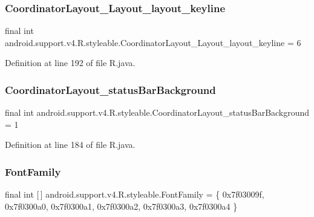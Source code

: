 \subsubsection{\texorpdfstring{CoordinatorLayout\_Layout\_layout\_keyline}{CoordinatorLayout\_Layout\_layout\_keyline}}
{\footnotesize\ttfamily final int android.\+support.\+v4.\+R.\+styleable.\+Coordinator\+Layout\+\_\+\+Layout\+\_\+layout\+\_\+keyline = 6\hspace{0.3cm}{\ttfamily [static]}}



Definition at line 192 of file R.\+java.

\mbox{\label{classandroid_1_1support_1_1v4_1_1_r_1_1styleable_a6a1da8ebca8b448fcdd32ead8be36d96}} 
\subsubsection{\texorpdfstring{CoordinatorLayout\_statusBarBackground}{CoordinatorLayout\_statusBarBackground}}
{\footnotesize\ttfamily final int android.\+support.\+v4.\+R.\+styleable.\+Coordinator\+Layout\+\_\+status\+Bar\+Background = 1\hspace{0.3cm}{\ttfamily [static]}}



Definition at line 184 of file R.\+java.

\mbox{\label{classandroid_1_1support_1_1v4_1_1_r_1_1styleable_af02bcd0e579c3c0485ea2152fa989b5d}} 
\subsubsection{\texorpdfstring{FontFamily}{FontFamily}}
{\footnotesize\ttfamily final int \mbox{[}$\,$\mbox{]} android.\+support.\+v4.\+R.\+styleable.\+Font\+Family = \{ 0x7f03009f, 0x7f0300a0, 0x7f0300a1, 0x7f0300a2, 0x7f0300a3, 0x7f0300a4 \}\hspace{0.3cm}{\ttfamily [static]}}



